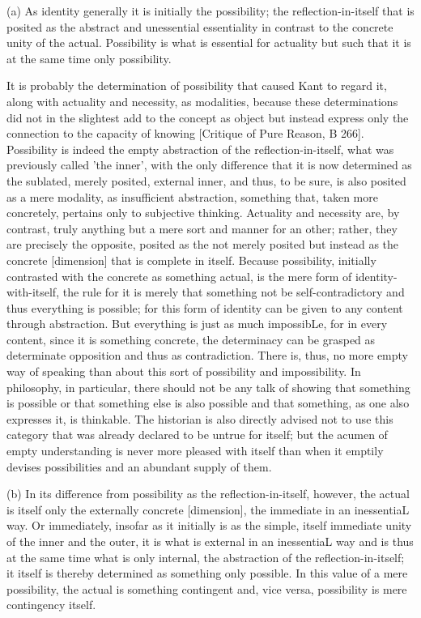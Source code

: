 (a) As identity generally it is initially the possibility;
the reflection-in-itself that is posited as
the abstract and unessential essentiality
in contrast to the concrete unity of the actual.
Possibility is what is essential for actuality but
such that it is at the same time only possibility.

    It is probably the determination of possibility that caused
    Kant to regard it, along with actuality and necessity, as modalities,
    because these determinations did not in the slightest add to the concept
    as object but instead express only the connection to the
    capacity of knowing [Critique of Pure Reason, B 266].
    Possibility is indeed the empty abstraction of the reflection-in-itself,
    what was previously called 'the inner', with the only difference that
    it is now determined as the sublated, merely posited, external inner,
    and thus, to be sure, is also posited as a mere modality,
    as insufficient abstraction, something that, taken more concretely,
    pertains only to subjective thinking.
    Actuality and necessity are, by contrast, truly
    anything but a mere sort and manner for an other; rather, they are
    precisely the opposite, posited as the not merely posited but instead
    as the concrete [dimension] that is complete in itself.
    Because possibility, initially contrasted with
    the concrete as something actual,
    is the mere form of identity-with-itself,
    the rule for it is merely that something not be self-contradictory and
    thus everything is possible;
    for this form of identity can be given to any content through abstraction.
    But everything is just as much impossibLe, for in
    every content, since it is something concrete, the determinacy can
    be grasped as determinate opposition and thus as contradiction.
    There is, thus, no more empty way of speaking than about this sort
    of possibility and impossibility.
    In philosophy, in particular, there should not be any talk of showing that
    something is possible or that something else is also possible and
    that something, as one also expresses it, is thinkable.
    The historian is also directly advised not to use this
    category that was already declared to be untrue for itself;
    but the acumen of empty understanding is never more pleased with itself
    than when it emptily devises possibilities and an abundant supply of them.

(b) In its difference from possibility as the reflection-in-itself, however,
the actual is itself only the externally concrete [dimension],
the immediate in an inessentiaL way.
Or immediately, insofar as it initially is as the simple,
itself immediate unity of the inner and the outer,
it is what is external in an inessentiaL way and
is thus at the same time what is only internal,
the abstraction of the reflection-in-itself;
it itself is thereby determined as something only possible.
In this value of a mere possibility, the actual is something contingent and,
vice versa, possibility is mere contingency itself.

